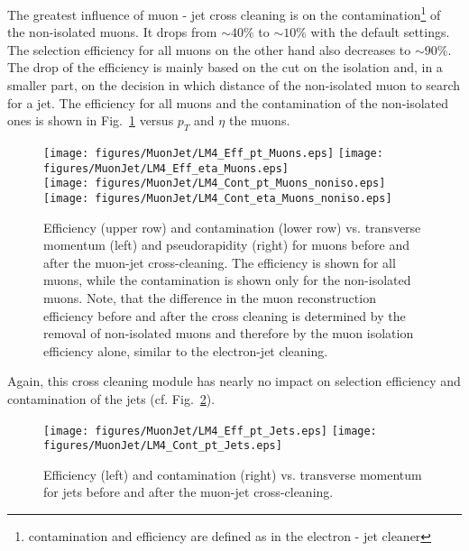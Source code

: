 \documentclass{cmspaper}
\begin{document}
The greatest influence of muon - jet cross cleaning is on the
contamination\footnote{contamination and efficiency are defined as in the
electron - jet cleaner} of the non-isolated muons. It drops from \(\sim 40 \%\)
to \(\sim 10 \%\) with the default settings. The selection efficiency for all
muons on the other hand also decreases to $\sim 90\%$. The
drop of the efficiency is mainly based on the cut on the isolation and, in a
smaller part, on the decision in which distance of the non-isolated muon to
search for a jet. The efficiency for all muons and the contamination of the
non-isolated ones is shown in Fig.~\ref{fig:effCont_muon_MuonJet} versus 
\(p_T\) and \(\eta\) the muons. 

\begin{figure}[hb]
\begin{center}
    \texttt{[image: figures/MuonJet/LM4\_Eff\_pt\_Muons.eps]}
    \texttt{[image: figures/MuonJet/LM4\_Eff\_eta\_Muons.eps]}\\
    \texttt{[image: figures/MuonJet/LM4\_Cont\_pt\_Muons\_noniso.eps]}
    \texttt{[image: figures/MuonJet/LM4\_Cont\_eta\_Muons\_noniso.eps]}
    \caption{Efficiency (upper row) and contamination (lower row) vs.
    transverse momentum (left) and pseudorapidity (right) for muons before and
    after the muon-jet cross-cleaning. The efficiency is shown for all muons,
    while the contamination is shown only for the non-isolated muons. Note, that
    the difference in the muon reconstruction efficiency before and after the
    cross cleaning is determined by the removal of non-isolated muons and
    therefore by the muon isolation efficiency alone, similar to the
    electron-jet cleaning. }
\label{fig:effCont_muon_MuonJet}
\end{center}
\end{figure}

Again, this cross cleaning module has nearly no impact on selection efficiency
and contamination of the jets (cf. Fig.~\ref{fig:effCont_Jets_MuonJet}).

\begin{figure}[hb]
\begin{center}
    \texttt{[image: figures/MuonJet/LM4\_Eff\_pt\_Jets.eps]}
    \texttt{[image: figures/MuonJet/LM4\_Cont\_pt\_Jets.eps]}
    \caption{Efficiency (left) and contamination (right) vs. transverse momentum
    for jets before and after the muon-jet cross-cleaning.}
\label{fig:effCont_Jets_MuonJet}
\end{center}
\end{figure}
\end{document}
